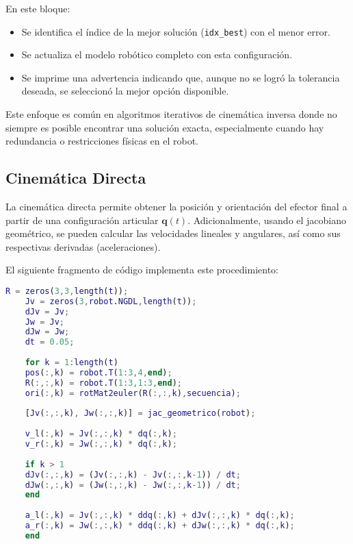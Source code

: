 En este bloque:

\begin{itemize}
	\item Se identifica el índice de la mejor solución (\texttt{idx\_best}) con el menor error.
	\item Se actualiza el modelo robótico completo con esta configuración.
	\item Se imprime una advertencia indicando que, aunque no se logró la tolerancia deseada, se seleccionó la mejor opción disponible.
\end{itemize}

Este enfoque es común en algoritmos iterativos de cinemática inversa donde no siempre es posible encontrar una solución exacta, especialmente cuando hay redundancia o restricciones físicas en el robot.

\subsection{Cinemática Directa}


La cinemática directa permite obtener la posición y orientación del efector final a partir de una configuración articular \( \mathbf{q}(t) \). Adicionalmente, usando el jacobiano geométrico, se pueden calcular las velocidades lineales y angulares, así como sus respectivas derivadas (aceleraciones).

El siguiente fragmento de código implementa este procedimiento:

\begin{lstlisting}[language=Matlab, caption={Cinemática directa, velocidades y aceleraciones}]
	R = zeros(3,3,length(t));
	Jv = zeros(3,robot.NGDL,length(t));
	dJv = Jv;
	Jw = Jv;
	dJw = Jw;
	dt = 0.05;
	
	for k = 1:length(t)
	pos(:,k) = robot.T(1:3,4,end);
	R(:,:,k) = robot.T(1:3,1:3,end);
	ori(:,k) = rotMat2euler(R(:,:,k),secuencia);
	
	[Jv(:,:,k), Jw(:,:,k)] = jac_geometrico(robot);
	
	v_l(:,k) = Jv(:,:,k) * dq(:,k);
	v_r(:,k) = Jw(:,:,k) * dq(:,k);
	
	if k > 1
	dJv(:,:,k) = (Jv(:,:,k) - Jv(:,:,k-1)) / dt;
	dJw(:,:,k) = (Jw(:,:,k) - Jw(:,:,k-1)) / dt;
	end
	
	a_l(:,k) = Jv(:,:,k) * ddq(:,k) + dJv(:,:,k) * dq(:,k);
	a_r(:,k) = Jw(:,:,k) * ddq(:,k) + dJw(:,:,k) * dq(:,k);
	end
\end{lstlisting}

